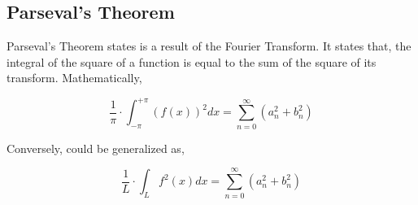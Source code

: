 

\subsection{{Parseval's Theorem}}

	{Parseval's Theorem states is a result of the Fourier Transform. It states that, the integral of the square of a function is equal to the sum of the square of its transform. Mathematically,}
	
		$$\frac{1}{\pi}\cdot\int_{-\pi}^{+\pi} \left(f(x)\right)^2 dx = \sum_{n=0}^{\infty}\left(a_{n}^2 + b_{n}^2\right)$$

	{Conversely, could be generalized as,}

		$$\frac{1}{L}\cdot\int_{L} f^2(x) dx = \sum_{n=0}^{\infty}\left(a_{n}^2 + b_{n}^2\right)$$



